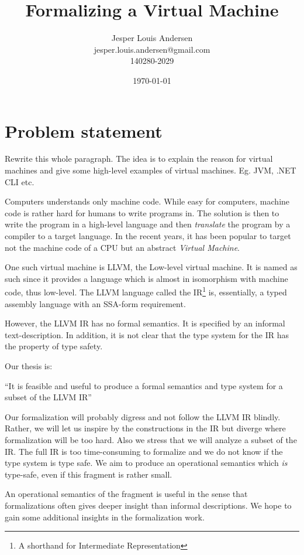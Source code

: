 \documentclass[a4paper, oneside, 10pt, draft]{memoir}
\author{Jesper Louis
  Andersen\\jesper.louis.andersen@gmail.com\\140280-2029}
\title{Formalizing a Virtual Machine}
\date{\today}
\begin{document}
\maketitle{}
\listoffixmes{}
\chapter*{Problem statement}

\begin{afixme}
  Rewrite this whole paragraph. The idea is to explain the reason for
  virtual machines and give some high-level examples of virtual
  machines. Eg. JVM, .NET CLI etc.
\end{afixme}
Computers understands only machine code. While easy for computers,
machine code is rather hard for humans to write programs in. The
solution is then to write the program in a high-level language and
then \emph{translate} the program by a compiler to a target
language. In the recent years, it has been popular to target not the
machine code of a CPU but an abstract \emph{Virtual Machine}.

One such virtual machine is LLVM, the Low-level virtual machine. It is
named as such since it provides a language which is almost in
isomorphism with machine code, thus low-level. The LLVM language
called the IR\footnote{A shorthand for Intermediate Representation}
is, essentially, a typed assembly language with an
SSA-form\cite{appel:modern} requirement.

However, the LLVM IR has no formal semantics. It is specified by an
informal text-description. In addition, it is not clear that the type
system for the IR has the property of type safety\cite{pierce:types}.

Our thesis is:

``It is feasible and useful to produce a formal semantics and type
system for a subset of the LLVM IR''

Our formalization will probably digress and not follow the LLVM IR
blindly. Rather, we will let us inspire by the constructions in the IR
but diverge where formalization will be too hard. Also we stress that
we will analyze a subset of the IR. The full IR is too time-consuming
to formalize and we do not know if the type system is type safe. We
aim to produce an operational semantics which \emph{is} type-safe,
even if this fragment is rather small.

An operational semantics of the fragment is useful in the sense that
formalizations often gives deeper insight than informal
descriptions. We hope to gain some additional insights in the
formalization work.
\end{document}
